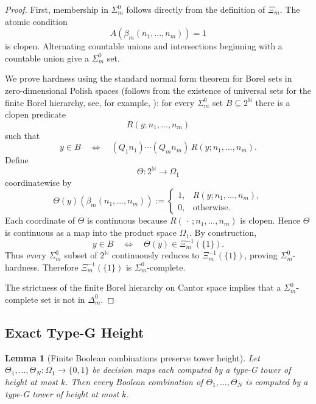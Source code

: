 \documentclass{lmcs} %
\theoremstyle{plain}
\theoremstyle{plain}
\newtheorem{lemma}[theorem]{Lemma}
\theoremstyle{definition}
\theoremstyle{remark}
\theoremstyle{definition}
\theoremstyle{remark}
\numberwithin{equation}{section}
\begin{document}
\begin{proof}
First, membership in \(\Sigma^0_m\) follows directly from the definition of \(\Xi_m\). The atomic condition
\[
A(\beta_m(n_1,\ldots,n_m))=1
\]
is clopen. Alternating countable unions and intersections beginning with a countable union give a \(\Sigma^0_m\) set.

We prove hardness using the standard normal form theorem for Borel sets in zero-dimensional Polish spaces (follows from the existence of universal sets for the finite
Borel hierarchy, see, for example, \cite[Theorem~3.6.6]{Sri98}): for every \(\Sigma^0_m\) set \(B\subseteq 2^{\mathbb N}\) there is a clopen predicate
\[
R(y;n_1,\ldots,n_m)
\]
such that
\[
y\in B \quad\Longleftrightarrow\quad (Q_1n_1)\cdots(Q_mn_m)\,R(y;n_1,\ldots,n_m).
\]
Define
\[
\Theta:2^{\mathbb N}\to\Omega_1
\]
coordinatewise by
\[
\Theta(y)(\beta_m(n_1,\ldots,n_m)) :=
\begin{cases}
1,&R(y;n_1,\ldots,n_m),\\
0,&\text{otherwise}.
\end{cases}
\]
Each coordinate of \(\Theta\) is continuous because \(R(\,\cdot\,;n_1,\ldots,n_m)\) is clopen. Hence \(\Theta\) is continuous as a map into the product space \(\Omega_1\). By construction,
\[
y\in B \quad\Longleftrightarrow\quad \Theta(y)\in\Xi_m^{-1}(\{1\}).
\]
Thus every \(\Sigma^0_m\) subset of \(2^{\mathbb N}\) continuously reduces to \(\Xi_m^{-1}(\{1\})\), proving \(\Sigma^0_m\)-hardness. Therefore \(\Xi_m^{-1}(\{1\})\) is \(\Sigma^0_m\)-complete.

The strictness of the finite Borel hierarchy on Cantor space implies that a \(\Sigma^0_m\)-complete set is not in \(\Delta^0_m\).
\end{proof}

\subsection{Exact Type-G Height}

\begin{lemma}[Finite Boolean combinations preserve tower height]\label{lem:boolean-combinations-same-height}
Let \(\Theta_1,\ldots,\Theta_N:\Omega_1\to\{0,1\}\) be decision maps each computed by a type-G tower of height at most \(k\). Then every Boolean combination of \(\Theta_1,\ldots,\Theta_N\) is computed by a type-G tower of height at most \(k\).
\end{lemma}
\end{document}
